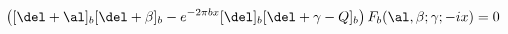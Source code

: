 \begin{equation}
\left([\del+\al]_{b}[\del+\beta]_{b}-e^{-2\pi
bx}[\del]_{b}[\del+\gamma-Q]_{b}\right)F_b(\al,\beta;\gamma;-ix)=0
\label{equ. q hyp} \nonumber
\end{equation}

